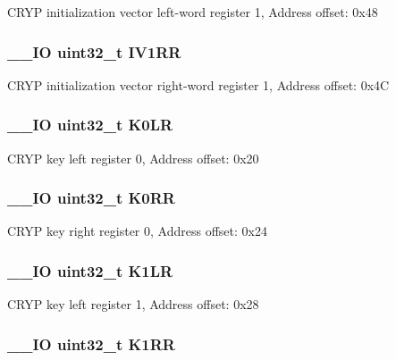 C\-R\-Y\-P initialization vector left-\/word register 1, Address offset\-: 0x48 \hypertarget{struct_c_r_y_p___type_def_a38a9f05c03174023fc6ac951c04eaeff}{
\subsubsection[{I\-V1\-R\-R}]{\setlength{\rightskip}{0pt plus 5cm}\-\_\-\-\_\-\-I\-O uint32\-\_\-t I\-V1\-R\-R}}\label{struct_c_r_y_p___type_def_a38a9f05c03174023fc6ac951c04eaeff}
C\-R\-Y\-P initialization vector right-\/word register 1, Address offset\-: 0x4\-C \hypertarget{struct_c_r_y_p___type_def_a3ca109e86323625e5f56f92f999c3b05}{
\subsubsection[{K0\-L\-R}]{\setlength{\rightskip}{0pt plus 5cm}\-\_\-\-\_\-\-I\-O uint32\-\_\-t K0\-L\-R}}\label{struct_c_r_y_p___type_def_a3ca109e86323625e5f56f92f999c3b05}
C\-R\-Y\-P key left register 0, Address offset\-: 0x20 \hypertarget{struct_c_r_y_p___type_def_ae6d97d339f0091d4a105001ea59086ae}{
\subsubsection[{K0\-R\-R}]{\setlength{\rightskip}{0pt plus 5cm}\-\_\-\-\_\-\-I\-O uint32\-\_\-t K0\-R\-R}}\label{struct_c_r_y_p___type_def_ae6d97d339f0091d4a105001ea59086ae}
C\-R\-Y\-P key right register 0, Address offset\-: 0x24 \hypertarget{struct_c_r_y_p___type_def_a948ff2e2e97978287411fe725dd70a7f}{
\subsubsection[{K1\-L\-R}]{\setlength{\rightskip}{0pt plus 5cm}\-\_\-\-\_\-\-I\-O uint32\-\_\-t K1\-L\-R}}\label{struct_c_r_y_p___type_def_a948ff2e2e97978287411fe725dd70a7f}
C\-R\-Y\-P key left register 1, Address offset\-: 0x28 \hypertarget{struct_c_r_y_p___type_def_a7554383cff84540eb260a3fdf55cb934}{
\subsubsection[{K1\-R\-R}]{\setlength{\rightskip}{0pt plus 5cm}\-\_\-\-\_\-\-I\-O uint32\-\_\-t K1\-R\-R}}\label{struct_c_r_y_p___type_def_a7554383cff84540eb260a3fdf55cb934}
